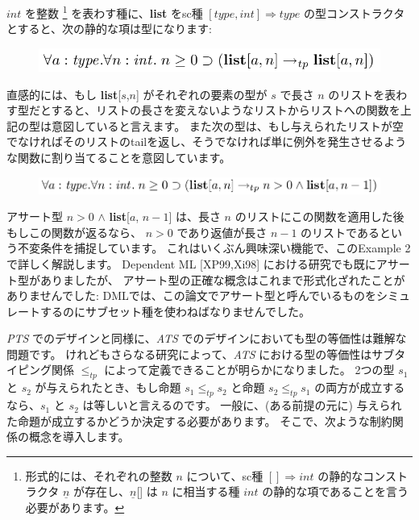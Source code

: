 \documentclass[submit,techreq,noauthor,onecolumn]{ipsj}
\begin{document}
$int$ を整数
\footnote{形式的には、それぞれの整数 $n$ について、sc種 $[] \Rightarrow int$ の静的なコンストラクタ $\underline n$ が存在し、$\underline n$[] は $n$ に相当する種 $int$ の静的な項であることを言う必要があります。
}
を表わす種に、{\bf list} をsc種 $[type,int] \Rightarrow type$ の型コンストラクタとすると、次の静的な項は型になります:

\begin{figure}[h]
\centering
\includegraphics[width=12cm]{img/infig21_example1_list1.png}
\end{figure}

\noindent 直感的には、もし {\bf list}[$s$,$n$] がそれぞれの要素の型が $s$ で長さ $n$ のリストを表わす型だとすると、リストの長さを変えないようなリストからリストへの関数を上記の型は意図していると言えます。
また次の型は、もし与えられたリストが空でなければそのリストのtailを返し、そうでなければ単に例外を発生させるような関数に割り当てることを意図しています。

\begin{figure}[h]
\centering
\includegraphics[width=14cm]{img/infig21_example1_list2.png}
\end{figure}

アサート型 $n > 0$ $\wedge$ {\bf list}[$a$, $n-1$] は、長さ $n$ のリストにこの関数を適用した後もしこの関数が返るなら、 $n > 0$ であり返値が長さ $n-1$ のリストであるという不変条件を捕捉しています。
これはいくぶん興味深い機能で、このExample 2で詳しく解説します。
Dependent ML [XP99,Xi98] における研究でも既にアサート型がありましたが、
アサート型の正確な概念はこれまで形式化ざれたことがありませんでした:
DMLでは、この論文でアサート型と呼んでいるものをシミュレートするのにサブセット種を使わねばなりませんでした。

{\it PTS} でのデザインと同様に、{\it ATS} でのデザインにおいても型の等価性は難解な問題です。
けれどもさらなる研究によって、{\it ATS} における型の等価性はサブタイピング関係 $\leq_{tp}$ によって定義できることが明らかになりました。
2つの型 $s_1$ と $s_2$ が与えられたとき、もし命題 $s_1 \leq_{tp} s_2$ と命題 $s_2 \leq_{tp} s_1$ の両方が成立するなら、$s_1$ と $s_2$ は等しいと言えるのです。
一般に、(ある前提の元に) 与えられた命題が成立するかどうか決定する必要があります。
そこで、次ような制約関係の概念を導入します。
\end{document}

